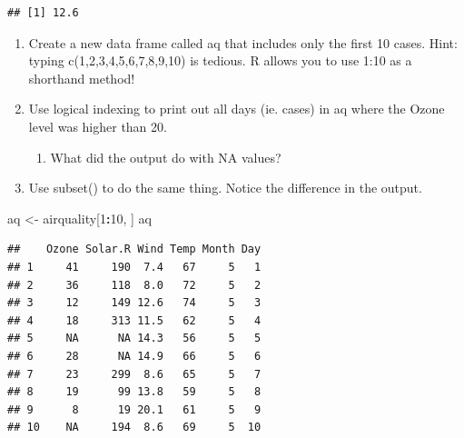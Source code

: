 \documentclass[
]{article}
\newenvironment{Shaded}{\begin{snugshade}}{\end{snugshade}}
\newcommand{\CommentTok}[1]{\textcolor[rgb]{0.56,0.35,0.01}{\textit{#1}}}
\newcommand{\DecValTok}[1]{\textcolor[rgb]{0.00,0.00,0.81}{#1}}
\newcommand{\NormalTok}[1]{#1}
\newcommand{\OtherTok}[1]{\textcolor[rgb]{0.56,0.35,0.01}{#1}}
\newcommand{\SpecialCharTok}[1]{\textcolor[rgb]{0.81,0.36,0.00}{\textbf{#1}}}
\providecommand{\tightlist}{%
  \setlength{\itemsep}{0pt}\setlength{\parskip}{0pt}}
\begin{document}
\begin{Shaded}
\end{Shaded}

\begin{verbatim}
## [1] 12.6
\end{verbatim}

\begin{enumerate}
\def\labelenumi{\arabic{enumi}.}
\setcounter{enumi}{15}
\tightlist
\item
  Create a new data frame called aq that includes only the first 10
  cases. Hint: typing c(1,2,3,4,5,6,7,8,9,10) is tedious. R allows you
  to use 1:10 as a shorthand method!
\item
  Use logical indexing to print out all days (ie. cases) in aq where the
  Ozone level was higher than 20.

  \begin{enumerate}
  \def\labelenumii{\alph{enumii}.}
  \tightlist
  \item
    What did the output do with NA values?
  \end{enumerate}
\item
  Use subset() to do the same thing. Notice the difference in the
  output.
\end{enumerate}

\begin{Shaded}
\begin{Highlighting}[]
\NormalTok{aq }\OtherTok{\textless{}{-}}\NormalTok{ airquality[}\DecValTok{1}\SpecialCharTok{:}\DecValTok{10}\NormalTok{, ]}
\NormalTok{aq}
\end{Highlighting}
\end{Shaded}

\begin{verbatim}
##    Ozone Solar.R Wind Temp Month Day
## 1     41     190  7.4   67     5   1
## 2     36     118  8.0   72     5   2
## 3     12     149 12.6   74     5   3
## 4     18     313 11.5   62     5   4
## 5     NA      NA 14.3   56     5   5
## 6     28      NA 14.9   66     5   6
## 7     23     299  8.6   65     5   7
## 8     19      99 13.8   59     5   8
## 9      8      19 20.1   61     5   9
## 10    NA     194  8.6   69     5  10
\end{verbatim}

\begin{Shaded}
\end{Shaded}
\end{document}
